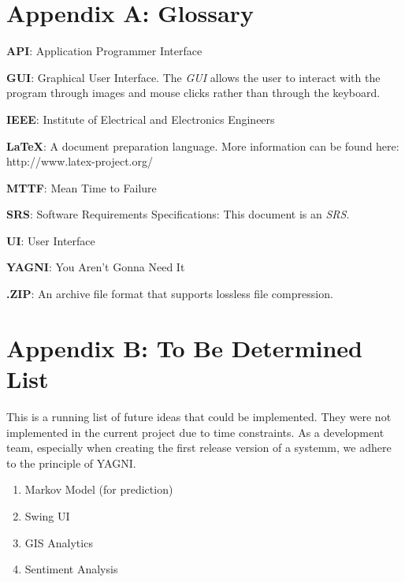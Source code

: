 \documentclass[a4paper, 12pt]{article}
\begin{document}
\section{Appendix A: Glossary} \label{sec:appendixa}
\begin{adjustwidth}{1em}{0pt}
\textbf{API}: Application Programmer Interface \newline

\noindent \textbf{GUI}: Graphical User Interface. The \textit{GUI} allows the user to interact with the program through images and mouse clicks rather than through the keyboard. \newline

\noindent \textbf{IEEE}: Institute of Electrical and Electronics Engineers \newline

\noindent \textbf{\LaTeX}: A document preparation language. More information can be found here: http://www.latex-project.org/ \newline

\noindent \textbf{MTTF}: Mean Time to Failure \newline

\noindent \textbf{SRS}: Software Requirements Specifications: This document is an \textit{SRS}. \newline

\noindent \textbf{UI}: User Interface \newline

\noindent \textbf{YAGNI}: You Aren't Gonna Need It

\noindent \textbf{.ZIP}: An archive file format that supports lossless file compression. \newline
\end{adjustwidth}

\section{Appendix B: To Be Determined List} \label{sec:appendixb}
\begin{adjustwidth}{1em}{0pt}
This is a running list of future ideas that could be implemented. They were not implemented in the current project due to time constraints. As a development team, especially when creating the first release version of a systemm, we adhere to the principle of YAGNI.
\begin{enumerate}
\item Markov Model (for prediction)
\item Swing UI
\item GIS Analytics
\item Sentiment Analysis
\end{enumerate} 
\end{adjustwidth}
\end{document}
